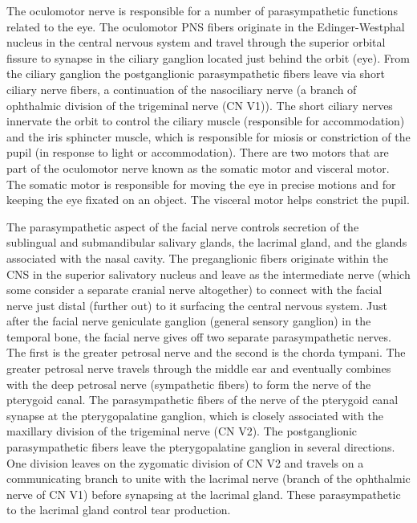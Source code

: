 \documentclass[]{book}
\begin{document}
The oculomotor nerve is responsible for a number of parasympathetic functions related to the eye. The oculomotor PNS fibers originate in the Edinger-Westphal nucleus in the central nervous system and travel through the superior orbital fissure to synapse in the ciliary ganglion located just behind the orbit (eye). From the ciliary ganglion the postganglionic parasympathetic fibers leave via short ciliary nerve fibers, a continuation of the nasociliary nerve (a branch of ophthalmic division of the trigeminal nerve (CN V1)). The short ciliary nerves innervate the orbit to control the ciliary muscle (responsible for accommodation) and the iris sphincter muscle, which is responsible for miosis or constriction of the pupil (in response to light or accommodation). There are two motors that are part of the oculomotor nerve known as the somatic motor and visceral motor. The somatic motor is responsible for moving the eye in precise motions and for keeping the eye fixated on an object. The visceral motor helps constrict the pupil.

The parasympathetic aspect of the facial nerve controls secretion of the sublingual and submandibular salivary glands, the lacrimal gland, and the glands associated with the nasal cavity. The preganglionic fibers originate within the CNS in the superior salivatory nucleus and leave as the intermediate nerve (which some consider a separate cranial nerve altogether) to connect with the facial nerve just distal (further out) to it surfacing the central nervous system. Just after the facial nerve geniculate ganglion (general sensory ganglion) in the temporal bone, the facial nerve gives off two separate parasympathetic nerves. The first is the greater petrosal nerve and the second is the chorda tympani. The greater petrosal nerve travels through the middle ear and eventually combines with the deep petrosal nerve (sympathetic fibers) to form the nerve of the pterygoid canal. The parasympathetic fibers of the nerve of the pterygoid canal synapse at the pterygopalatine ganglion, which is closely associated with the maxillary division of the trigeminal nerve (CN V2). The postganglionic parasympathetic fibers leave the pterygopalatine ganglion in several directions. One division leaves on the zygomatic division of CN V2 and travels on a communicating branch to unite with the lacrimal nerve (branch of the ophthalmic nerve of CN V1) before synapsing at the lacrimal gland. These parasympathetic to the lacrimal gland control tear production.
\end{document}

